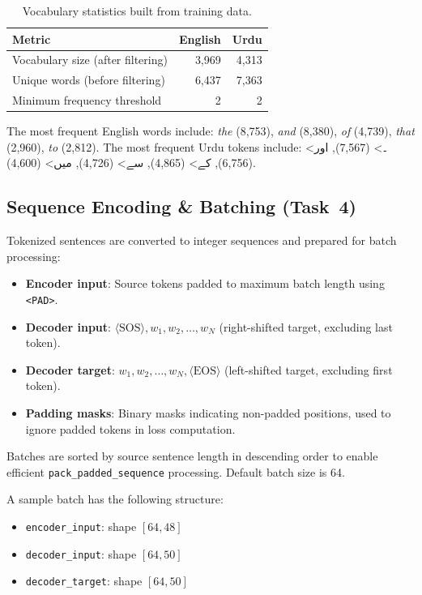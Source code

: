 \documentclass[runningheads]{llncs}
\begin{document}
\begin{table}[H]
\centering
\caption{Vocabulary statistics built from training data.}
\label{tab:vocab}
\begin{tabular}{@{}lrr@{}}
\toprule
\textbf{Metric} & \textbf{English} & \textbf{Urdu} \\
\midrule
Vocabulary size (after filtering)   & 3,969 & 4,313 \\
Unique words (before filtering)     & 6,437 & 7,363 \\
Minimum frequency threshold         & 2     & 2 \\
\bottomrule
\end{tabular}
\end{table}

The most frequent English words include: \textit{the} (8,753), \textit{and} (8,380), \textit{of} (4,739), \textit{that} (2,960), \textit{to} (2,812). The most frequent Urdu tokens include: \<۔> (7,567), \<اور> (6,756), \<کے> (4,865), \<سے> (4,726), \<میں> (4,600).

\subsection{Sequence Encoding \& Batching (Task~4)}

Tokenized sentences are converted to integer sequences and prepared for batch processing:

\begin{itemize}
    \item \textbf{Encoder input}: Source tokens padded to maximum batch length using \texttt{<PAD>}.
    \item \textbf{Decoder input}: $\langle\text{SOS}\rangle, w_1, w_2, \ldots, w_N$ (right-shifted target, excluding last token).
    \item \textbf{Decoder target}: $w_1, w_2, \ldots, w_N, \langle\text{EOS}\rangle$ (left-shifted target, excluding first token).
    \item \textbf{Padding masks}: Binary masks indicating non-padded positions, used to ignore padded tokens in loss computation.
\end{itemize}

Batches are sorted by source sentence length in descending order to enable efficient \texttt{pack\_padded\_sequence} processing. Default batch size is 64.

A sample batch has the following structure:
\begin{itemize}
    \item \texttt{encoder\_input}: shape $[64, 48]$
    \item \texttt{decoder\_input}: shape $[64, 50]$
    \item \texttt{decoder\_target}: shape $[64, 50]$
\end{itemize}
\end{document}
